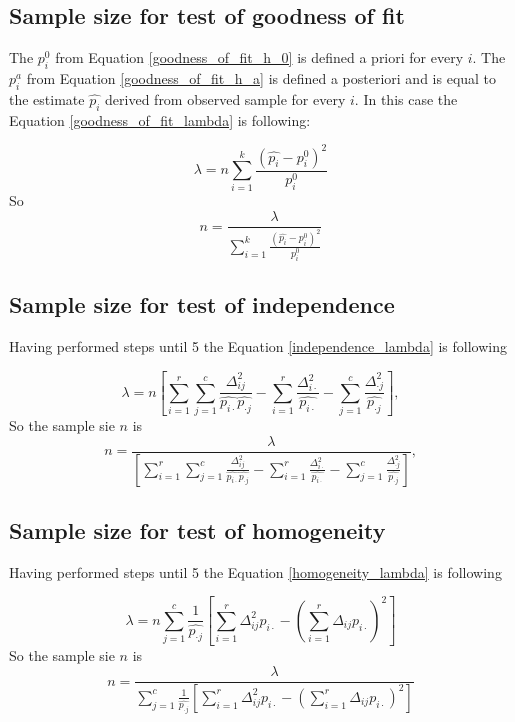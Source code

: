 \documentclass{article}
\begin{document}
\subsection{Sample size for test of goodness of fit}
The $p_i^0$ from Equation \ref{goodness_of_fit_h_0} is defined a priori for every $i$.
The $p_i^a$ from Equation \ref{goodness_of_fit_h_a} is defined a posteriori and is equal to the estimate $\widehat{p_{i}}$ derived from observed sample for every $i$.
In this case the Equation \ref{goodness_of_fit_lambda} is following:

\begin{equation}
    \lambda = n \sum_{i=1}^k \frac{\left(\widehat{p_{i}}-p_{i}^0\right)^2}{p_{i}^0}
\end{equation}
So
\begin{equation}
    n = \frac{\lambda}{\sum_{i=1}^k \frac{\left(\widehat{p_{i}}-p_{i}^0\right)^2}{p_{i}^0}}
\end{equation}


\subsection{Sample size for test of independence}

Having performed steps until 5 the Equation \ref{independence_lambda} is following

\begin{equation}
    \lambda = n\left[\sum_{i=1}^{r}\sum_{j=1}^c \frac{\Delta_{ij}^2}{\widehat{p_{i\cdot}}\widehat{p_{\cdot j}}} - \sum_{i=1}^{r}\frac{\Delta_{i \cdot}^2}{\widehat{p_{i \cdot}}} - \sum_{j=1}^{c}\frac{\Delta_{\cdot j}^2}{\widehat{p_{\cdot j}}}\right],
\end{equation}
So the sample sie $n$ is
\begin{equation}
    n = \frac{\lambda}{\left[\sum_{i=1}^{r}\sum_{j=1}^c \frac{\Delta_{ij}^2}{\widehat{p_{i\cdot}}\widehat{p_{\cdot j}}} - \sum_{i=1}^{r}\frac{\Delta_{i \cdot}^2}{\widehat{p_{i \cdot}}} - \sum_{j=1}^{c}\frac{\Delta_{\cdot j}^2}{\widehat{p_{\cdot j}}}\right]},
\end{equation}

\subsection{Sample size for test of homogeneity}

Having performed steps until 5 the Equation \ref{homogeneity_lambda} is following

\begin{equation}
    \lambda = n\sum_{j=1}^{c}\frac{1}{\widehat{p_{\cdot j}}}\left[ \sum_{i=1}^{r} \Delta_{ij}^2 p_{i\cdot} -  \left(\sum_{i=1}^{r} \Delta_{ij} p_{i\cdot}\right)^2  \right]
\end{equation}
So the sample sie $n$ is
\begin{equation}
    n = \frac{\lambda}{\sum_{j=1}^{c}\frac{1}{\widehat{p_{\cdot j}}}\left[ \sum_{i=1}^{r} \Delta_{ij}^2 p_{i\cdot} -  \left(\sum_{i=1}^{r} \Delta_{ij} p_{i\cdot}\right)^2  \right]}
\end{equation}
\end{document}
